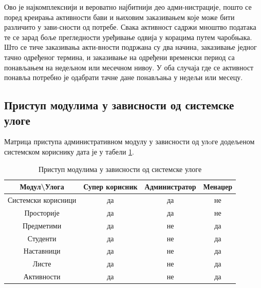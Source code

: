 \documentclass[a4paper, 12pt, diplomski]{etfcyr}
\makeatletter
\gdef\tshortstack{\@ifnextchar[\@tshortstack{\@tshortstack[c]}}
\let\@tshortstack\@shortstack
\makeatother
\begin{document}
\begin{justify}
\begin{labeling}{\smash{\tshortstack[l]{Управљање\\активностима}}}
						\item[\smash{\tshortstack[l]{Управљање\\активностима}}]
							\begin{justify}
								Ово је најкомплекснији и вероватно најбитнији део адми-нистрације, пошто се поред креирања активности бави и њиховим заказивањем које може бити различито у зави-сности од потребе. Свака активност садржи мноштво података те се зарад боље прегледности уређивање одвија у корацима путем чаробњака. Што се тиче заказивања акти-вности подржана су два начина, заказивање једног тачно одређеног термина, и заказивање на одређени временски период са понављањем на недељном или месечном нивоу. У оба случаја где се активност понавља потребно је одабрати тачне дане понављања у недељи или месецу.
							\end{justify}

						\end{labeling}
				\end{justify}

			\newpage

			\subsection{Приступ модулима у зависности од системске улоге}
				\begin{justify}
					Матрица приступа административном модулу у зависности од улoге додељеном системском кориснику дата је у табели \ref{table:1}.
				\end{justify}
				\begin{table}[H]
					\centering
					\begin{tabular}{ c||c|c|c }
						Модул\textbackslash Улога & Супер корисник & Администратор & Менаџер \\
						\hline\hline
						Системски корисници & да & да & не \\
						Просторије & да & да & не \\
						Предметими & да & не & да \\
						Студенти & да & не & да \\
						Наставници & да & не & да \\
						Листе & да & не & да \\
						Активности & да & не & да \\
						\hline
					\end{tabular}
					\caption{Приступ модулима у зависности од системске улоге}
					\label{table:1}
				\end{table}
\end{document}
